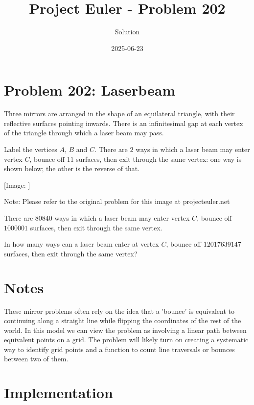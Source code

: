 \documentclass{article}
\title{Project Euler - Problem 202}
\author{Solution}
\date{2025-06-23}
\begin{document}
\maketitle

\section*{Problem 202: Laserbeam}


Three mirrors are arranged in the shape of an equilateral triangle, with their reflective surfaces pointing inwards. There is an infinitesimal gap at each vertex of the triangle through which a laser beam may pass.

\par
Label the vertices $A$, $B$ and $C$. There are $2$ ways in which a laser beam may enter vertex $C$, bounce off $11$ surfaces, then exit through the same vertex: one way is shown below; the other is the reverse of that.

\par
\begin{center}
[Image: ]

\par
Note: Please refer to the original problem for this image at projecteuler.net
\end{center}
There are $80840$ ways in which a laser beam may enter vertex $C$, bounce off $1000001$ surfaces, then exit through the same vertex.

\par
In how many ways can a laser beam enter at vertex $C$, bounce off $12017639147$ surfaces, then exit through the same vertex?

\par


\section*{Notes}

These mirror problems often rely on the idea that a 'bounce' is equivalent to continuing along a straight line while flipping the coordinates of the rest of the world.  In this model we can view the problem as involving a linear path between equivalent points on a grid.  The problem will likely turn on creating a systematic way to identify grid points and a function to count line traversals or bounces between two of them. 

\section*{Implementation}

\end{document}
